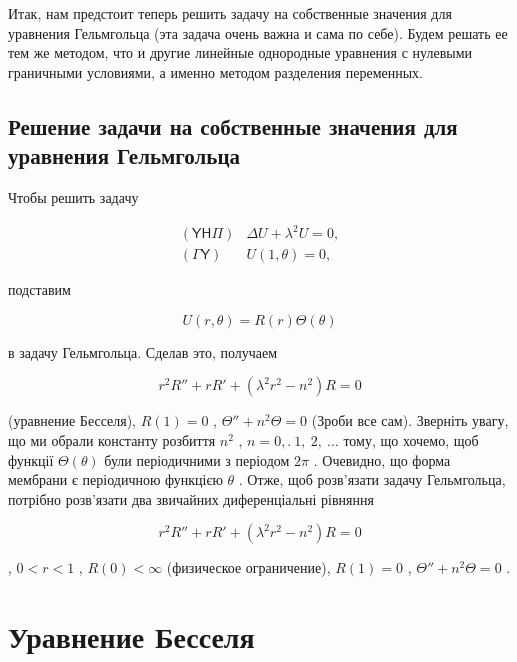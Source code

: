 \documentclass[
  ukrainian,
]{article}
\begin{document}
Итак, нам предстоит теперь решить задачу на собственные значения для
уравнения Гельмгольца (эта задача очень важна и сама по себе). Будем
решать ее тем же методом, что и другие линейные однородные уравнения с
нулевыми граничными условиями, а именно методом разделения переменных.

\subsection{Решение задачи на собственные значения для уравнения
Гельмгольца}\label{ux440ux435ux448ux435ux43dux438ux435-ux437ux430ux434ux430ux447ux438-ux43dux430-ux441ux43eux431ux441ux442ux432ux435ux43dux43dux44bux435-ux437ux43dux430ux447ux435ux43dux438ux44f-ux434ux43bux44f-ux443ux440ux430ux432ux43dux435ux43dux438ux44f-ux433ux435ux43bux44cux43cux433ux43eux43bux44cux446ux430}

Чтобы решить задачу

\[
\begin{array}{ll} (\mathsf{Y}\mathsf{H}\mathsf{\Pi}) & \Delta U + \lambda^2 U = 0, \\ (\mathsf{\Gamma}\mathsf{Y}) & U(1, \theta) = 0, \end{array}
\]

подставим

\[
U(r, \theta) = R(r) \Theta(\theta)
\]

в задачу Гельмгольца. Сделав это, получаем

\[
r^2R'' + rR' + (\lambda^2r^2 - n^2)R = 0
\]

(уравнение Бесселя), \(R(1) = 0\) , \(\Theta'' + n^2\Theta = 0\) (Зроби
все сам). Зверніть увагу, що ми обрали константу розбиття \(n^2\) ,
\(n=0,. \ 1,\ 2,\ \ldots\) тому, що хочемо, щоб функції
\(\Theta\left(\theta\right)\) були періодичними з періодом \(2\pi\) .
Очевидно, що форма мембрани є періодичною функцією \(\theta\) . Отже,
щоб розв'язати задачу Гельмгольца, потрібно розв'язати два звичайних
диференціальні рівняння

\[
r^2R'' + rR' + (\lambda^2r^2 - n^2) R = 0
\]

, \(0 < r < 1\) , \(R(0) < \infty\) (физическое ограничение),
\(R(1) = 0\) , \(\Theta'' + n^2\Theta = 0\) .

\section{Уравнение
Бесселя}\label{ux443ux440ux430ux432ux43dux435ux43dux438ux435-ux431ux435ux441ux441ux435ux43bux44f}
\end{document}
